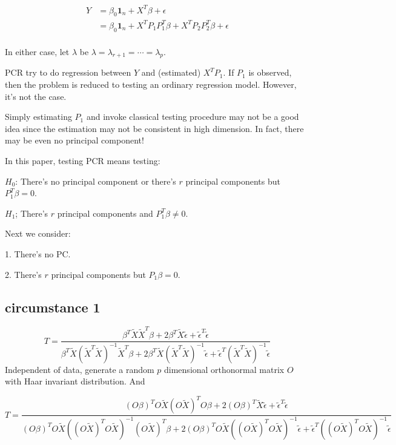 \documentclass[review]{elsarticle}
\theoremstyle{plain}
\theoremstyle{definition}
\theoremstyle{remark}
\begin{document}
\begin{equation}
    \begin{aligned}
        Y&=\beta_0 \textbf{1}_n+X^T\beta+\epsilon\\
        &=\beta_0 \textbf{1}_n+X^T P_1P_1^T\beta+X^T P_2 P_2^T\beta+\epsilon\\
    \end{aligned}
\end{equation}

In either case, let $\lambda$ be $\lambda=\lambda_{r+1}=\cdots=\lambda_{p}$.

PCR try to do regression between $Y$ and (estimated) $X^T P_1$. If $P_1$ is observed, then the problem is reduced to testing an ordinary regression model. However, it's not the case.

Simply estimating $P_1$ and invoke classical testing procedure may not be a good idea since the estimation may not be consistent in high dimension. In fact, there may be even no principal component!

In this paper, testing PCR means testing:

$H_0$: There's no principal component or there's $r$ principal components but $P_1^T \beta =0$.

$H_1$; There's $r$ principal components and $P_1^T \beta \neq 0$.

Next we consider:

1. There's no PC.\@

2. There's $r$ principal components but $P_1\beta=0$.

\subsection{circumstance 1}


\begin{equation}
    T=\frac{\beta^T \tilde{X}\tilde{X}^T \beta+
        2\beta^T \tilde{X}\tilde{\epsilon}+
        \tilde{\epsilon}^T\tilde{\epsilon}
    }{\beta^T \tilde{X}{(\tilde{X}^T\tilde{X})}^{-1}\tilde{X}^T \beta+
        2\beta^T \tilde{X}{(\tilde{X}^T\tilde{X})}^{-1}\tilde{\epsilon}+
        \tilde{\epsilon}^T{(\tilde{X}^T\tilde{X})}^{-1}\tilde{\epsilon}
    }
\end{equation}
Independent of data, generate a random $p$ dimensional orthonormal matrix $O$ with Haar invariant distribution. And 

\begin{equation}
    T=\frac{{(O\beta)}^T O\tilde{X}{(O\tilde{X})}^T O\beta+
        2{(O\beta)}^T \tilde{X}\tilde{\epsilon}+
        \tilde{\epsilon}^T\tilde{\epsilon}
    }{{(O\beta)}^T O\tilde{X}{({(O\tilde{X})}^T O\tilde{X})}^{-1}{(O\tilde{X})}^T \beta+
        2{(O\beta)}^T O\tilde{X}{({(O\tilde{X})}^T O\tilde{X})}^{-1}\tilde{\epsilon}+
        \tilde{\epsilon}^T{({(O\tilde{X})}^T O\tilde{X})}^{-1}\tilde{\epsilon}
    }
\end{equation}
\end{document}
